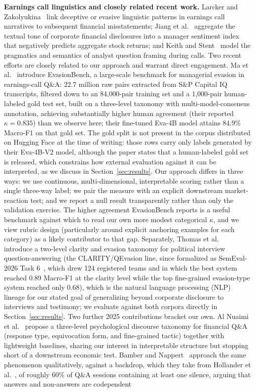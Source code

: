 \documentclass[conference]{IEEEtran}
\begin{document}
\textbf{Earnings call linguistics and closely related recent work.} Larcker and Zakolyukina~\cite{larcker2012detecting} link deceptive or evasive linguistic patterns in earnings call narratives to subsequent financial misstatements; Jiang et al.~\cite{jiang2019manager} aggregate the textual tone of corporate financial disclosures into a manager sentiment index that negatively predicts aggregate stock returns; and Keith and Stent~\cite{keith2019modeling} model the pragmatics and semantics of analyst question framing during calls. Two recent efforts are closely related to our approach and warrant direct engagement. Ma et al.~\cite{ma2026evasionbench} introduce EvasionBench, a large-scale benchmark for managerial evasion in earnings-call Q\&A: 22.7 million raw pairs extracted from S\&P Capital IQ transcripts, filtered down to an 84,000-pair training set and a 1,000-pair human-labeled gold test set, built on a three-level taxonomy with multi-model-consensus annotation, achieving substantially higher human agreement (their reported $\kappa = 0.835$) than we observe here; their fine-tuned Eva-4B model attains 84.9\% Macro-F1 on that gold set. The gold split is not present in the corpus distributed on Hugging Face at the time of writing: those rows carry only labels generated by their Eva-4B-V2 model, although the paper states that a human-labeled gold set is released, which constrains how external evaluation against it can be interpreted, as we discuss in Section~\ref{sec:results}. Our approach differs in three ways: we use continuous, multi-dimensional, interpretable scoring rather than a single three-way label; we pair the measure with an explicit downstream market-reaction test; and we report a null result transparently rather than only the validation exercise. The higher agreement EvasionBench reports is a useful benchmark against which to read our own more modest categorical $\kappa$, and we view rubric design (particularly around explicit anchoring examples for each category) as a likely contributor to that gap. Separately, Thomas et al.~\cite{thomas2024never} introduce a two-level clarity and evasion taxonomy for political interview question-answering (the CLARITY/QEvasion line, since formalized as SemEval-2026 Task 6~\cite{thomas2026clarity}, which drew 124 registered teams and in which the best system reached 0.89 Macro-F1 at the clarity level while the top fine-grained evasion-type system reached only 0.68), which is the natural language processing (NLP) lineage for our stated goal of generalizing beyond corporate disclosure to interviews and testimony; we evaluate against both corpora directly in Section~\ref{sec:results}. Two further 2025 contributions bracket our own. Al Nuaimi et al.~\cite{alnuaimi2025evasive} propose a three-level psychological discourse taxonomy for financial Q\&A (response type, equivocation form, and fine-grained tactic) together with lightweight baselines, sharing our interest in interpretable structure but stopping short of a downstream economic test. Bamber and Nappert~\cite{bamber2025nonanswers} approach the same phenomenon qualitatively, against a backdrop, which they take from Hollander et al.~\cite{hollander2010silence}, of roughly 60\% of Q\&A sessions containing at least one silence, arguing that answers and non-answers are codependent 
\end{document}
